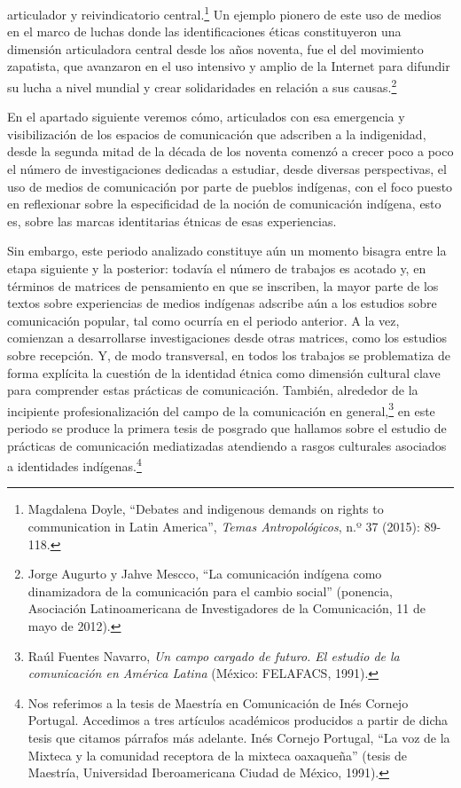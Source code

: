\documentclass{tufte-handout}
\begin{document}
articulador y reivindicatorio central.\footnote{Magdalena Doyle,
  ``Debates and indigenous demands on rights to communication in Latin
  America'', \emph{Temas Antropológicos}, n.º 37 (2015): 89-118.} Un
ejemplo pionero de este uso de medios en el marco de luchas donde las
identificaciones éticas constituyeron una dimensión articuladora central
desde los años noventa, fue el del movimiento zapatista, que avanzaron
en el uso intensivo y amplio de la Internet para difundir su lucha a
nivel mundial y crear solidaridades en relación a sus causas.\footnote{Jorge
  Augurto y Jahve Mescco, ``La comunicación indígena como dinamizadora
  de la comunicación para el cambio social'' (ponencia, Asociación
  Latinoamericana de Investigadores de la Comunicación, 11 de mayo de
  2012).}

En el apartado siguiente veremos cómo, articulados con esa emergencia y
visibilización de los espacios de comunicación que adscriben a la
indigenidad, desde la segunda mitad de la década de los noventa comenzó
a crecer poco a poco el número de investigaciones dedicadas a estudiar,
desde diversas perspectivas, el uso de medios de comunicación por parte
de pueblos indígenas, con el foco puesto en reflexionar sobre la
especificidad de la noción de comunicación indígena, esto es, sobre las
marcas identitarias étnicas de esas experiencias.

Sin embargo, este periodo analizado constituye aún un momento bisagra
entre la etapa siguiente y la posterior: todavía el número de trabajos
es acotado y, en términos de matrices de pensamiento en que se
inscriben, la mayor parte de los textos sobre experiencias de medios
indígenas adscribe aún a los estudios sobre comunicación popular, tal
como ocurría en el periodo anterior. A la vez, comienzan a desarrollarse
investigaciones desde otras matrices, como los estudios sobre recepción.
Y, de modo transversal, en todos los trabajos se problematiza de forma
explícita la cuestión de la identidad étnica como dimensión cultural
clave para comprender estas prácticas de comunicación. También,
alrededor de la incipiente profesionalización del campo de la
comunicación en general,\footnote{Raúl Fuentes Navarro, \emph{Un campo
  cargado de futuro. El estudio de la comunicación en América Latina}
  (México: FELAFACS, 1991).} en este periodo se produce la primera tesis
de posgrado que hallamos sobre el estudio de prácticas de comunicación
mediatizadas atendiendo a rasgos culturales asociados a identidades
indígenas.\footnote{Nos referimos a la tesis de Maestría en Comunicación
  de Inés Cornejo Portugal. Accedimos a tres artículos académicos
  producidos a partir de dicha tesis que citamos párrafos más adelante.
  Inés Cornejo Portugal, ``La voz de la Mixteca y la comunidad receptora
  de la mixteca oaxaqueña'' (tesis de Maestría, Universidad
  Iberoamericana Ciudad de México, 1991).}
\end{document}

